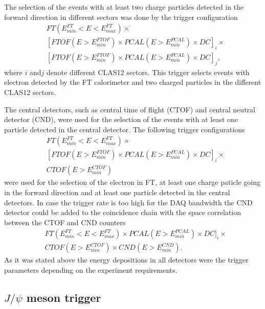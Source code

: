 The selection of the events with at least two charge particles detected in the forward direction in different sectors was done by the trigger configuration
 \begin{align*} 
 &FT(E^{FT}_{min}{<}E{<}E^{FT}_{max})\times\\
 & [FTOF(E{>}E^{FTOF}_{min})\times  PCAL(E{>}E^{PCAL}_{min})\times   DC]_i \times \\
 & [FTOF(E{>}E^{FTOF}_{min})\times  PCAL(E{>}E^{PCAL}_{min})\times   DC]_j,
\end{align*}
 where $i$ and$j$ denote different CLAS12 sectors. This trigger selects events with electron detected by the FT calorimeter and two charged particles in the different CLAS12 sectors. 
 
 The central detectors, such as central time of flight (CTOF) and central neutral detector (CND), were used for the selection of the events with at least one  particle detected in the central detector. The following trigger configurations
 \begin{align*} 
 &FT(E^{FT}_{min}{<}E{<}E^{FT}_{max})\times\\
 & [FTOF(E{>}E^{FTOF}_{min})\times  PCAL(E{>}E^{PCAL}_{min})\times   DC]_i \times \\
 & CTOF(E{>}E^{CTOF}_{min})\end{align*}
\noindent
were used for the selection of the electron in FT, at least one charge paticle going in the forward direction and at least one particle detected in the central detectors.
In case the trigger rate is too high for the DAQ bandwidth the CND detector could be added to the coincidence chain with the space correlation between the CTOF and CND counters
 \begin{align*} 
 &FT(E^{FT}_{min}{<}E{<}E^{FT}_{max})\times PCAL(E{>}E^{PCAL}_{min})\times   DC]_i \times \\
 & CTOF(E{>}E^{CTOF}_{min})\times  CND(E{>}E^{CND}_{min}).
\end{align*}
\noindent
 As it was stated above the energy depositions in all detectors were the trigger parameters depending on the experiment requirements.


\subsection{$J/\psi$ meson trigger}
\label{sec:meson_trigger}

